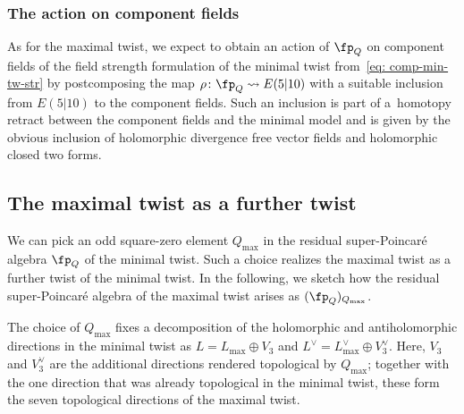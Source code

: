 \documentclass[pdftex]{sigma}
\numberwithin{equation}{section}
\theoremstyle{definition}
\begin{document}
\subsubsection{The action on component fields}
As for the maximal twist, we expect to obtain an action of $\fp_Q$ on component fields of the field strength formulation of the minimal twist from~\eqref{eq: comp-min-tw-str} by postcomposing the map $\rho\colon \fp_Q\rightsquigarrow E(5|10)$ with a suitable inclusion from $E(5|10)$ to the component fields. Such an inclusion is part of a~homotopy retract between the component fields and the minimal model and is given by the obvious inclusion of holomorphic divergence free vector fields and holomorphic closed two forms.

\subsection{The maximal twist as a further twist} \label{sec: further}
We can pick an odd square-zero element $Q_{\max}$ in the residual super-Poincar\'e algebra $\fp_Q$ of the minimal twist. Such a choice realizes the maximal twist as a further twist of the minimal twist. In the following, we sketch how the residual super-Poincar\'e algebra of the maximal twist arises as $(\fp_Q)_{Q_{\max}}$.

The choice of $Q_{\max}$ fixes a decomposition of the holomorphic and antiholomorphic directions in the minimal twist as
$
 L = L_{\max} \oplus V_3 $ and $L^\vee = L^\vee_{\max} \oplus V_3^\vee$.
Here, $V_3$ and $V_3^\vee$ are the additional directions rendered topological by $Q_{\max}$; together with the one direction that was already topological in the minimal twist, these form the seven topological directions of the maximal twist.
\end{document}

